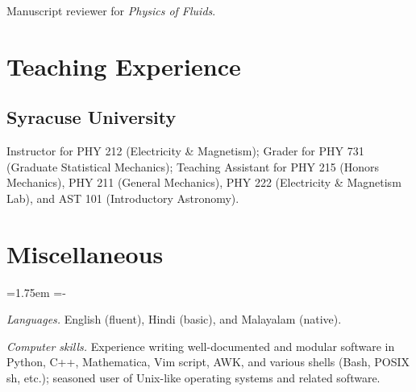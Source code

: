 \documentclass[10pt,a4paper,article,oneside]{memoir}
\def\hangpars{%
  \leftskip=1.75em%
  \parindent=-\leftskip%
  \setsecindent{-\leftskip}%
  \setsubsecindent{-\leftskip}%
}
\begin{document}
Manuscript reviewer for \emph{Physics of Fluids}.


\section{Teaching Experience}

\subsection{Syracuse University}

Instructor for PHY 212 (Electricity \& Magnetism); Grader for PHY 731 (Graduate Statistical Mechanics); Teaching Assistant for PHY 215 (Honors Mechanics), PHY 211 (General Mechanics), PHY 222 (Electricity \& Magnetism Lab), and AST 101 (Introductory Astronomy).


\section{Miscellaneous}

\hangpars

\emph{Languages.\enspace} English (fluent), Hindi (basic), and Malayalam (native).

\emph{Computer skills.\enspace} Experience writing well-documented and modular software in Python, C++, Mathematica, Vim script, AWK, and various shells (Bash, POSIX sh, etc.); seasoned user of Unix-like operating systems and related software.

\end{document}
